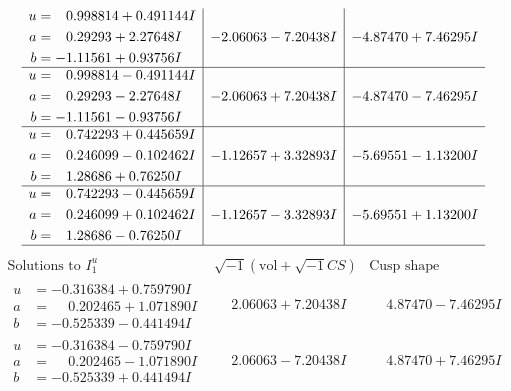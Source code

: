 \documentclass[1p]{elsarticle_modified}
\theoremstyle{definition}
\newcommand{\I}{\sqrt{-1}}
\begin{document}
$$\begin{array}{c|c|c}
\begin{aligned}
u &= \phantom{-}0.998814 + 0.491144 I \\
a &= \phantom{-}0.29293 + 2.27648 I \\
b &= -1.11561 + 0.93756 I\end{aligned}
 & -2.06063 - 7.20438 I & -4.87470 + 7.46295 I \\ \hline\begin{aligned}
u &= \phantom{-}0.998814 - 0.491144 I \\
a &= \phantom{-}0.29293 - 2.27648 I \\
b &= -1.11561 - 0.93756 I\end{aligned}
 & -2.06063 + 7.20438 I & -4.87470 - 7.46295 I \\ \hline\begin{aligned}
u &= \phantom{-}0.742293 + 0.445659 I \\
a &= \phantom{-}0.246099 - 0.102462 I \\
b &= \phantom{-}1.28686 + 0.76250 I\end{aligned}
 & -1.12657 + 3.32893 I & -5.69551 - 1.13200 I \\ \hline\begin{aligned}
u &= \phantom{-}0.742293 - 0.445659 I \\
a &= \phantom{-}0.246099 + 0.102462 I \\
b &= \phantom{-}1.28686 - 0.76250 I\end{aligned}
 & -1.12657 - 3.32893 I & -5.69551 + 1.13200 I\\
 \hline 
 \end{array}$$\newpage$$\begin{array}{c|c|c}  
\text{Solutions to }I^u_{1}& \I (\text{vol} + \sqrt{-1}CS) & \text{Cusp shape}\\
 \hline 
\begin{aligned}
u &= -0.316384 + 0.759790 I \\
a &= \phantom{-}0.202465 + 1.071890 I \\
b &= -0.525339 - 0.441494 I\end{aligned}
 & \phantom{-}2.06063 + 7.20438 I & \phantom{-}4.87470 - 7.46295 I \\ \hline\begin{aligned}
u &= -0.316384 - 0.759790 I \\
a &= \phantom{-}0.202465 - 1.071890 I \\
b &= -0.525339 + 0.441494 I\end{aligned}
 & \phantom{-}2.06063 - 7.20438 I & \phantom{-}4.87470 + 7.46295 I \\ \hline\begin{aligned}

\end{aligned}
\end{array}$$
\end{document}
